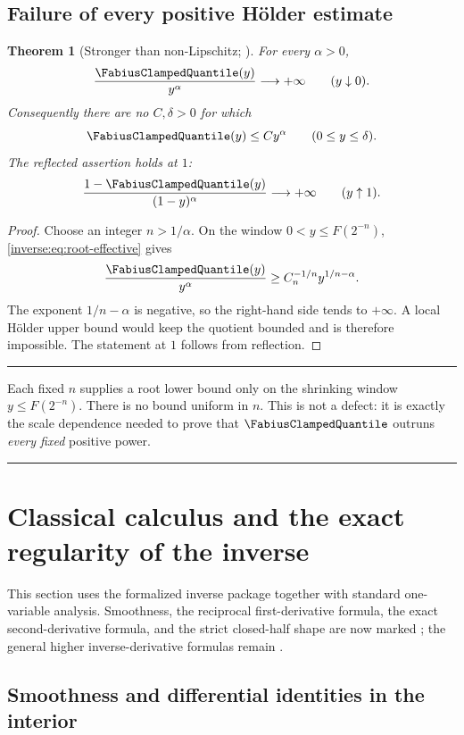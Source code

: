 \documentclass[11pt,oneside]{article}
\newtheorem{theorem}{Theorem}[section]
\theoremstyle{definition}
\theoremstyle{remark}
\newenvironment{boxedremark}{%
  \par\smallskip\noindent\begin{center}\begin{minipage}{0.94\textwidth}%
  \color{black}\hrule\vspace{0.6em}\small
}{%
  \vspace{0.6em}\hrule\end{minipage}\end{center}\smallskip
}
\begin{document}
\subsection{Failure of every positive Hölder estimate}

\begin{theorem}[Stronger than non-Lipschitz; \Derived]
\label{inverse:thm:no-holder}
For every $\alpha>0$,
\[
 \frac{\FabiusClampedQuantile(y)}{y^\alpha}\longrightarrow+\infty
 \qquad (y\downarrow0).
\]
Consequently there are no $C,\delta>0$ for which
\[
 \FabiusClampedQuantile(y)\leq Cy^\alpha\qquad(0\leq y\leq\delta).
\]
The reflected assertion holds at $1$:
\[
 \frac{1-\FabiusClampedQuantile(y)}{(1-y)^\alpha}\longrightarrow+\infty
 \qquad (y\uparrow1).
\]
\end{theorem}

\begin{proof}
Choose an integer $n>1/\alpha$.  On the window
$0<y\leq F(2^{-n})$, \cref{inverse:eq:root-effective} gives
\[
 \frac{\FabiusClampedQuantile(y)}{y^\alpha}
 \geq C_n^{-1/n}y^{1/n-\alpha}.
\]
The exponent $1/n-\alpha$ is negative, so the right-hand side tends to
$+\infty$.  A local Hölder upper bound would keep the quotient bounded and
is therefore impossible.  The statement at $1$ follows from reflection.
\end{proof}

\begin{boxedremark}
Each fixed $n$ supplies a root lower bound only on the shrinking window
$y\leq F(2^{-n})$.  There is no bound uniform in $n$.  This is not a
defect: it is exactly the scale dependence needed to prove that
$\FabiusClampedQuantile$ outruns \emph{every fixed} positive power.
\end{boxedremark}


\section{Classical calculus and the exact regularity of the inverse}
\label{inverse:sec:inverse-calculus}

This section uses the formalized inverse package together with standard
one-variable analysis.  Smoothness, the reciprocal first-derivative formula,
the exact second-derivative formula, and the strict closed-half shape are now
marked \Formalized; the general higher inverse-derivative formulas remain
\Derived.

\subsection{Smoothness and differential identities in the interior}
\end{document}
